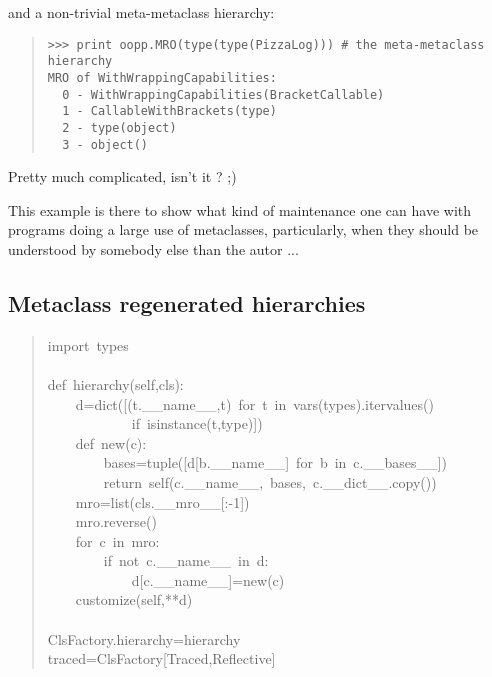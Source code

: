 \documentclass[10pt,english]{article}
\begin{document}
and a non-trivial meta-metaclass hierarchy:
\begin{quote}
\begin{verbatim}>>> print oopp.MRO(type(type(PizzaLog))) # the meta-metaclass hierarchy
MRO of WithWrappingCapabilities:
  0 - WithWrappingCapabilities(BracketCallable)
  1 - CallableWithBrackets(type)
  2 - type(object)
  3 - object()\end{verbatim}
\end{quote}

Pretty much complicated, isn't it ? ;)

This example is there to show what kind of maintenance one can have
with programs doing a large use of metaclasses, particularly, when
they should be understood by somebody else than the autor ...



\hypertarget{metaclass-regenerated-hierarchies}{}
\subsection*{Metaclass regenerated hierarchies}
\begin{quote}
\begin{ttfamily}\begin{flushleft}
\mbox{import~types}\\
\mbox{~~}\\
\mbox{def~hierarchy(self,cls):}\\
\mbox{~~~~d=dict([(t.{\_}{\_}name{\_}{\_},t)~for~t~in~vars(types).itervalues()}\\
\mbox{~~~~~~~~~~~~if~isinstance(t,type)])}\\
\mbox{~~~~def~new(c):}\\
\mbox{~~~~~~~~bases=tuple([d[b.{\_}{\_}name{\_}{\_}]~for~b~in~c.{\_}{\_}bases{\_}{\_}])}\\
\mbox{~~~~~~~~return~self(c.{\_}{\_}name{\_}{\_},~bases,~c.{\_}{\_}dict{\_}{\_}.copy())}\\
\mbox{~~~~mro=list(cls.{\_}{\_}mro{\_}{\_}[:-1])}\\
\mbox{~~~~mro.reverse()}\\
\mbox{~~~~for~c~in~mro:}\\
\mbox{~~~~~~~~if~not~c.{\_}{\_}name{\_}{\_}~in~d:}\\
\mbox{~~~~~~~~~~~~d[c.{\_}{\_}name{\_}{\_}]=new(c)}\\
\mbox{~~~~customize(self,**d)}\\
\mbox{}\\
\mbox{ClsFactory.hierarchy=hierarchy}\\
\mbox{traced=ClsFactory[Traced,Reflective]}
\end{flushleft}\end{ttfamily}
\end{quote}
\end{document}
